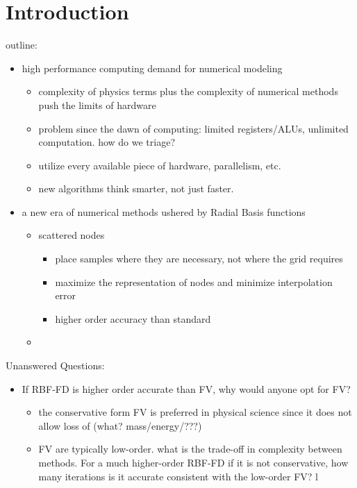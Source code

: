 \documentclass[11pt]{report}
\begin{document}
\fi

\chapter{Introduction}
outline:
\begin{itemize} 
\item high performance computing demand for numerical modeling
\begin{itemize} 
\item complexity of physics terms plus the complexity of numerical methods push the limits of hardware
\item problem since the dawn of computing: limited registers/ALUs, unlimited computation. how do we triage?
\item utilize every available piece of hardware, parallelism, etc.
\item new algorithms think smarter, not just faster.
\end{itemize}
\item a new era of numerical methods ushered by Radial Basis functions
\begin{itemize} 
\item scattered nodes
\begin{itemize}
\item place samples where they are necessary, not where the grid requires
\item maximize the representation of nodes and minimize interpolation error
\item higher order accuracy than standard 
\end{itemize}

\item 
\end{itemize}

\end{itemize}

Unanswered Questions: 
\begin{itemize} 
\item If RBF-FD is higher order accurate than FV, why would anyone opt for FV?
\begin{itemize} 
\item the conservative form FV is preferred in physical science since it does not allow loss of (what? mass/energy/???)
\item FV are typically low-order. what is the trade-off in complexity between methods. For a much higher-order RBF-FD if it is not conservative, how many iterations is it accurate consistent with the low-order FV? l
\end{itemize}

\end{itemize}
\end{document}
